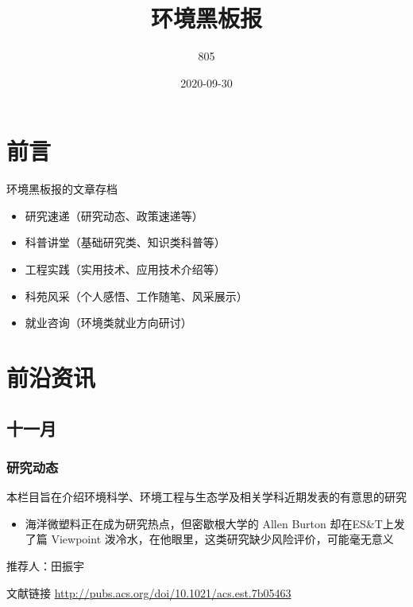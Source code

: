 \documentclass[]{book}
\title{环境黑板报}
\author{805}
\date{2020-09-30}
\providecommand{\tightlist}{%
  \setlength{\itemsep}{0pt}\setlength{\parskip}{0pt}}
\begin{document}
\maketitle

{
\setcounter{tocdepth}{1}
\tableofcontents
}
\hypertarget{ux524dux8a00}{%
\chapter{前言}\label{ux524dux8a00}}

环境黑板报的文章存档

\begin{itemize}
\item
  研究速递（研究动态、政策速递等）
\item
  科普讲堂（基础研究类、知识类科普等）
\item
  工程实践（实用技术、应用技术介绍等）
\item
  科苑风采（个人感悟、工作随笔、风采展示）
\item
  就业咨询（环境类就业方向研讨）
\end{itemize}

\hypertarget{news}{%
\chapter{前沿资讯}\label{news}}

\hypertarget{ux5341ux4e00ux6708}{%
\section*{十一月}\label{ux5341ux4e00ux6708}}

\hypertarget{ux7814ux7a76ux52a8ux6001}{%
\subsection*{研究动态}\label{ux7814ux7a76ux52a8ux6001}}

本栏目旨在介绍环境科学、环境工程与生态学及相关学科近期发表的有意思的研究

\begin{itemize}
\tightlist
\item
  海洋微塑料正在成为研究热点，但密歇根大学的 Allen Burton 却在ES\&T上发了篇 Viewpoint 泼冷水，在他眼里，这类研究缺少风险评价，可能毫无意义
\end{itemize}

推荐人：田振宇

文献链接 \url{http://pubs.acs.org/doi/10.1021/acs.est.7b05463}
\end{document}
